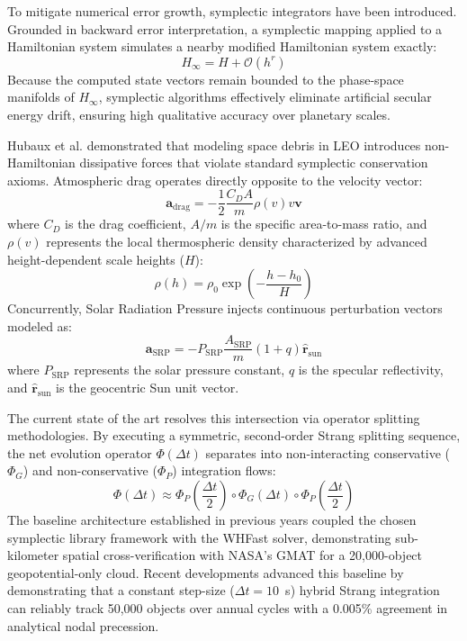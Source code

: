 \documentclass[11pt,letterpaper]{article}
\begin{document}
To mitigate numerical error growth, symplectic integrators have been introduced\cite{tsang_slimplectic_2015}. Grounded in backward error interpretation, a symplectic mapping applied to a Hamiltonian system simulates a nearby modified Hamiltonian system exactly:
\begin{equation}
    H_{\infty} = H + \mathcal{O}(h^r)
\end{equation}
Because the computed state vectors remain bounded to the phase-space manifolds of $H_{\infty}$, symplectic algorithms effectively eliminate artificial secular energy drift, ensuring high qualitative accuracy over planetary scales.

Hubaux et al. demonstrated that modeling space debris in LEO introduces non-Hamiltonian dissipative forces that violate standard symplectic conservation axioms. Atmospheric drag operates directly opposite to the velocity vector:
\begin{equation}
    \mathbf{a}_{\text{drag}} = -\frac{1}{2}\frac{C_D A}{m} \rho(v) v \mathbf{v}
\end{equation}
where $C_D$ is the drag coefficient, $A/m$ is the specific area-to-mass ratio, and $\rho(v)$ represents the local thermospheric density characterized by advanced height-dependent scale heights ($H$):
\begin{equation}
    \rho(h) = \rho_0 \exp\left(-\frac{h - h_0}{H}\right)
\end{equation}
Concurrently, Solar Radiation Pressure injects continuous perturbation vectors modeled as:
\begin{equation}
    \mathbf{a}_{\text{SRP}} = -P_{\text{SRP}} \frac{A_{\text{SRP}}}{m} (1+q) \hat{\mathbf{r}}_{\text{sun}}
\end{equation}
where $P_{\text{SRP}}$ represents the solar pressure constant, $q$ is the specular reflectivity, and $\hat{\mathbf{r}}_{\text{sun}} $ is the geocentric Sun unit vector.

The current state of the art resolves this intersection via operator splitting methodologies\cite{macnamara_operator_2016}. By executing a symmetric, second-order Strang splitting sequence, the net evolution operator $\Phi(\Delta t)$ separates into non-interacting conservative ($\Phi_G$) and non-conservative ($\Phi_P$) integration flows:
\begin{equation}
    \Phi(\Delta t) \approx \Phi_P\left(\frac{\Delta t}{2}\right) \circ \Phi_G(\Delta t) \circ \Phi_P\left(\frac{\Delta t}{2}\right)
\end{equation}
The baseline architecture established in previous years coupled the chosen symplectic library framework with the WHFast solver, demonstrating sub-kilometer spatial cross-verification with NASA's GMAT for a 20,000-object geopotential-only cloud\cite{noauthor_general_nodate-1}. Recent developments advanced this baseline by demonstrating that a constant step-size ($\Delta t = 10$~s) hybrid Strang integration can reliably track 50,000 objects over annual cycles with a 0.005\% agreement in analytical nodal precession. 
\end{document}
